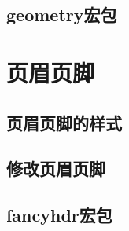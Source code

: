 \subsection{\textsf{geometry}宏包}

\section{页眉页脚}

\subsection{页眉页脚的样式}

\subsection{修改页眉页脚}

\subsection{\textsf{fancyhdr}宏包}

\endinput